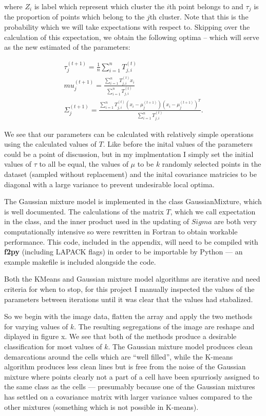 \documentclass[a4paper]{article}
\begin{document}
where $Z_i$ is label which represent which cluster the $i$th point belongs to and $\tau_j$ is the proportion of points which belong to the $j$th cluster. Note that this is the probability which we will take expectations with respect to. Skipping over the calculation of this expectation, we obtain the following optima -- which will serve as the new estimated of the parameters:

\begin{gather}
\tau_j^{(t+1)} = \frac{1}{n} \sum_{i=1}^n T_{j, i}^{(t)} \\
mu_j^{(t+1)} = \frac{\sum_{i=1}^n T_{j,i}^{(t)} x_i}{\sum_{i=1}^n T_{j,i}^{(t)}} \\
\Sigma_j^{(t+1)} = \frac{\sum_{i=1}^n T_{j,i}^{(t)} (x_i - \mu_j^{(t+1)}){(x_i - \mu_j^{(t+1)})}^T}{\sum_{i=1}^n T_{j,i}^{(t)}}.
\end{gather}

We see that our parameters can be calculated with relatively simple operations using the calculated values of $T$. Like before the inital values of the parameters could be a point of discussion, but in my implmentation I simply set the initial values of $\tau$ to all be equal, the values of $\mu$ to be $k$ randomly selected points in the dataset (sampled without replacement) and the inital covariance matricies to be diagonal with a large variance to prevent undesirable local optima.

The Gaussian mixture model is implemented in the class GaussianMixture, which is well documented. The calculations of the matrix $T$, which we call expectation in the class, and the inner product used in the updating of $Sigma$ are both very computationally intensive so were rewritten in Fortran to obtain workable performance. This code, included in the appendix, will need to be compiled with {\bf f2py} (including LAPACK flags) in order to be importable by Python --- an example makefile is included alongside the code.

Both the KMeans and Gaussian mixture model algorithms are iterative and need criteria for when to stop, for this project I manually inspected the values of the parameters between iterations until it was clear that the values had stabalized. 

So we begin with the image data, flatten the array and apply the two methods for varying values of $k$. The resulting segregations of the image are reshape and diplayed in figure x. We see that both of the methods produce a desirable classification for most values of $k$. The Gaussian mixture model produces clean demarcations around the cells which are ``well filled'', while the K-means algorithm produces less clean lines but is free from the noise of the Gaussian mixture where points clearly not a part of a cell have been spurriosly assigned to the same class as the cells --- presumably because one of the Gaussian mixtures has settled on a covariance matrix with larger variance values compared to the other mixtures (something which is not possible in K-means). 
\end{document}
